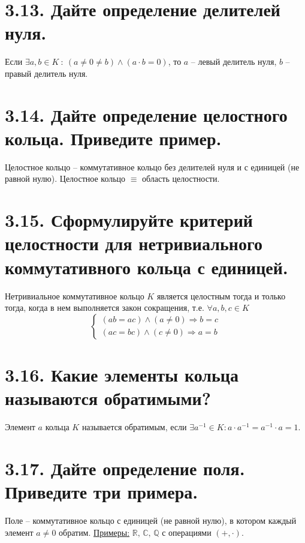 \documentclass{article}
\begin{document}
\section*{\LARGE 3.13. Дайте определение делителей нуля. }
Если $\exists a,b \in K \::\: (a \ne 0 \ne b) \wedge (a\cdot b = 0)$, то $a$ -- левый делитель нуля, $b$ -- правый делитель нуля. 

\section*{\LARGE 3.14. Дайте определение целостного кольца. Приведите пример. }
Целостное кольцо -- коммутативное кольцо без делителей нуля и с единицей (не равной нулю). Целостное кольцо $\equiv$ область целостности.

\section*{\LARGE 3.15. Сформулируйте критерий целостности для нетривиального коммутативного кольца с единицей. }
Нетривиальное коммутативное кольцо $K$ является целостным тогда и только тогда, когда в нем выполняется закон сокращения, т.е. $\forall a,b,c \in K$
$$
\begin{cases}
(ab = ac)\wedge(a \ne 0) \Rightarrow b = c \\
(ac = bc)\wedge(c\ne 0) \Rightarrow a = b
\end{cases}
$$

\section*{\LARGE 3.16. Какие элементы кольца называются обратимыми? }
Элемент $a$ кольца $K$ называется обратимым, если $\exists a^{-1} \in K : a\cdot a^{-1} = a^{-1}\cdot a = 1$.

\section*{\LARGE 3.17. Дайте определение поля. Приведите три примера. }
Поле -- коммутативное кольцо с единицей (не равной нулю), в котором каждый элемент $a \ne 0$ обратим.
\newline \underline{Примеры:} $\mathbb{R}, \, \mathbb{C}, \, \mathbb{Q}$ с операциями $(+, \cdot)$.
\end{document}
